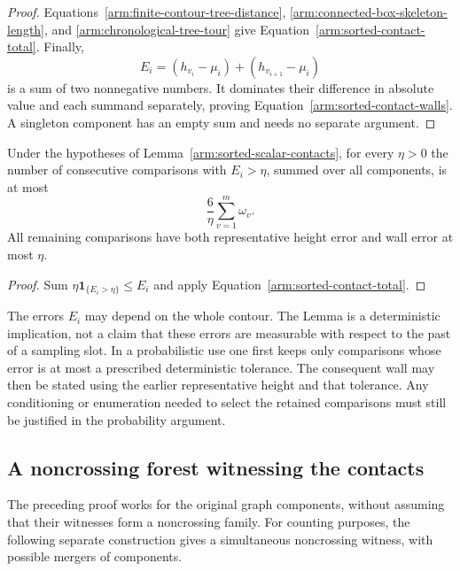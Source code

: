 \begin{proof}
Equations~\eqref{arm:finite-contour-tree-distance},
\eqref{arm:connected-box-skeleton-length}, and
\eqref{arm:chronological-tree-tour} give
Equation~\eqref{arm:sorted-contact-total}.  Finally,
\[
 E_i=(h_{v_i}-\mu_i)+(h_{v_{i+1}}-\mu_i)
\]
is a sum of two nonnegative numbers.  It dominates their difference in
absolute value and each summand separately, proving
Equation~\eqref{arm:sorted-contact-walls}.  A singleton component has an
empty sum and needs no separate argument.
\end{proof}

\begin{corollary}
\label{arm:sorted-contact-discard}
Under the hypotheses of Lemma~\ref{arm:sorted-scalar-contacts}, for every
$\eta>0$ the number of consecutive comparisons with $E_i>\eta$, summed
over all components, is at most
\[
 \frac{6}{\eta}\sum_{v=1}^m\omega_v.
\]
All remaining comparisons have both representative height error and
wall error at most $\eta$.
\end{corollary}

\begin{proof}
Sum $\eta\mathbf 1_{\{E_i>\eta\}}\le E_i$ and apply
Equation~\eqref{arm:sorted-contact-total}.
\end{proof}

\begin{remark}\label{arm:sorted-contact-adaptedness}
The errors $E_i$ may depend on the whole contour.  The Lemma is a
deterministic implication, not a claim that these errors are measurable
with respect to the past of a sampling slot.  In a probabilistic use one
first keeps only comparisons whose error is at most a prescribed
deterministic tolerance.  The consequent wall may then be stated using
the earlier representative height and that tolerance.  Any conditioning
or enumeration needed to select the retained comparisons must still be
justified in the probability argument.
\end{remark}

\subsection{A noncrossing forest witnessing the contacts}

The preceding proof works for the original graph components, without
assuming that their witnesses form a noncrossing family.  For counting
purposes, the following separate construction gives a simultaneous
noncrossing witness, with possible mergers of components.


